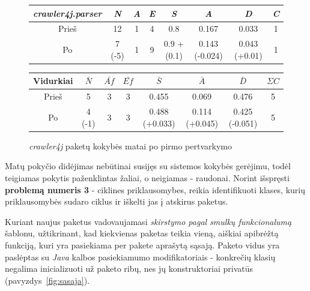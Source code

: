 \begin{figure}[H]
\begin{center}
    \begin{tabular}{|c|c|c|c|c|c|c|c|}
        \hline
        \textit{crawler4j.parser} & \textit{N} & \textit{A} & \textit{E} & \textit{S} & \textit{A} & \textit{D} & \textit{C} \\ [0.5ex]
        \hline\hline
        Prieš & 12 & 1 & 4 & 0.8 & 0.167 & 0.033 & 1 \\
        \hline
        Po & \cellcolor{green!25} 7 (-5) & 1 & 9 & \cellcolor{red!25} 0.9 + (0.1) & \cellcolor{red!25} 0.143 (-0.024) & \cellcolor{red!25} 0.043 (+0.01) & 1 \\
        \hline
    \end{tabular}
    \begin{tabular}{|c|c|c|c|c|c|c|c|}
        \hline
        Vidurkiai & $\bar{N}$ & $\bar{Af}$ & $\bar{Ef}$ & $\bar{S}$ & $\bar{A}$ & $\bar{D}$ & $\Sigma C$ \\ [0.5ex]
        \hline\hline
        Prieš & 5 & 3 & 3 & 0.455 & 0.069 & 0.476 & 5\\
        \hline
        Po & \cellcolor{green!25} 4 (-1) & 3 & 3 & \cellcolor{red!25} 0.488 (+0.033) & \cellcolor{green!25} 0.114 (+0.045) & \cellcolor{green!25} 0.425 (-0.051) & 5 \\
        \hline
    \end{tabular}
\end{center}
\caption{\textit{crawler4j} paketų kokybės matai po pirmo pertvarkymo}
\label{table:parsers}
\end{figure}
Matų pokyčio didėjimas nebūtinai susijęs su sistemos kokybės gerėjimu, todėl teigiamas pokytis paženklintas žaliai, o neigiamas - raudonai.
Norint išspręsti \textbf{problemą numeris 3} - ciklines priklausomybes, reikia identifikuoti klases, kurių priklausomybės
sudaro ciklus ir iškelti jas į atskirus paketus.

Kuriant naujus paketus vadovaujamasi \textit{skirstymo pagal smulkų funkcionalumą} šablonu, užtikrinant, kad kiekvienas
paketas teikia vieną, aiškiai apibrėžtą funkciją, kuri yra pasiekiama per pakete aprašytą sąsają.
Paketo vidus yra paslėptas su \textit{Java} kalbos pasiekiamumo modifikatoriais - konkrečių klasių negalima inicializuoti už paketo ribų,
nes jų konstruktoriai privatūs (pavyzdys~\ref{fig:sasaja}).

